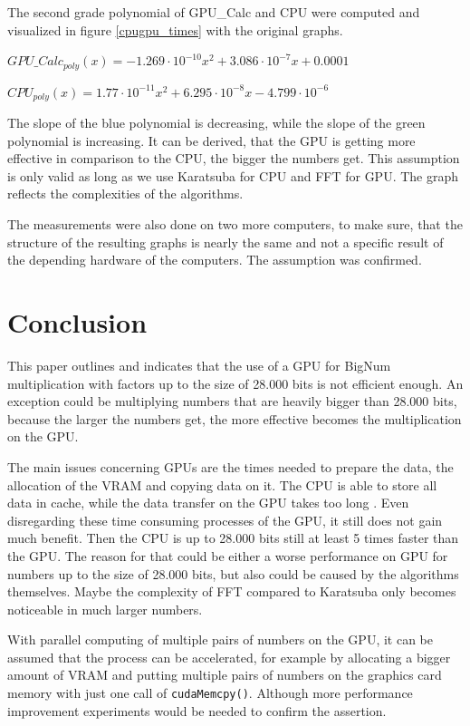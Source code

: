 \documentclass[12pt,a4paper]{article}
\begin{document}
The second grade polynomial of GPU\_Calc and CPU were computed and visualized in figure \ref{cpugpu_times} with the original graphs.
 
\begin{center}
    $GPU\_Calc_{poly}(x) = -1.269 \cdot 10^{-10}x^2 + 3.086 \cdot 10^{-7}x + 0.0001$
\end{center}

\begin{center}
    $CPU_{poly}(x) = 1.77 \cdot 10^{-11}x^2 + 6.295 \cdot 10^{-8}x - 4.799 \cdot 10^{-6}$
\end{center}

The slope of the blue polynomial is decreasing, while the slope of the green polynomial is increasing. It can be derived, that the GPU is getting more effective in comparison to the CPU, the bigger the numbers get. This assumption is only valid as long as we use Karatsuba for CPU and FFT for GPU. The graph reflects the complexities of the algorithms.

The measurements were also done on two more computers, to make sure, that the structure of the resulting graphs is nearly the same and not a specific result of the depending hardware of the computers. The assumption was confirmed.

\section{Conclusion}
This paper outlines and indicates that the use of a GPU for BigNum multiplication with factors up to the size of 28.000 bits is not efficient enough. An exception could be multiplying numbers that are heavily bigger than 28.000 bits, because the larger the numbers get, the more effective becomes the multiplication on the GPU. 

The main issues concerning GPUs are the times needed to prepare the data, the allocation of the VRAM and copying data on it. The CPU is able to store all data in cache, while the data transfer on the GPU takes too long \cite{cooper2011gpu}. Even disregarding these time consuming processes of the GPU, it still does not gain much benefit. Then the CPU is up to 28.000 bits still at least 5 times faster than the GPU. The reason for that could be either a worse performance on GPU for numbers up to the size of 28.000 bits, but also could  be caused by the algorithms themselves. Maybe the complexity of FFT compared to Karatsuba only becomes noticeable in much larger numbers.

 With parallel computing of multiple pairs of numbers on the GPU, it can be assumed that the process can be accelerated, for example by allocating a bigger amount of VRAM and putting multiple pairs of numbers on the graphics card memory with just one call of \texttt{cudaMemcpy()}. Although more performance improvement experiments would be needed to confirm the assertion.


\end{document}
